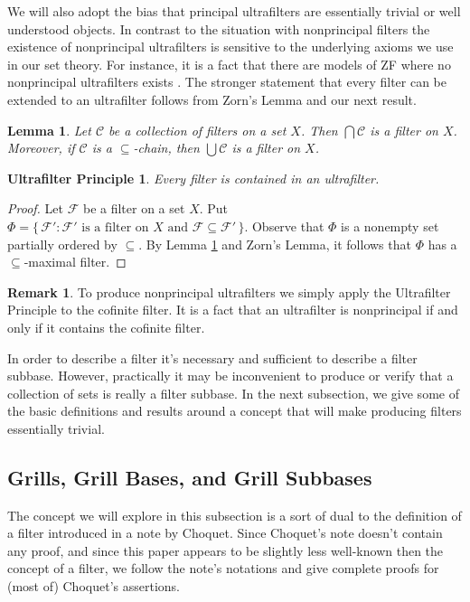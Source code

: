 \documentclass[12pt]{article}
\theoremstyle{plain}
\newtheorem{lem}[thm]{Lemma}
\newtheorem{up}[thm]{Ultrafilter Principle}
\theoremstyle{definition}
\newtheorem{rmk}[thm]{Remark}
\newcommand{\calC}{\mathcal{C}}
\newcommand{\calF}{\mathcal{F}}
\begin{document}
We will also adopt the bias that principal ultrafilters are
essentially trivial or well understood objects.
In contrast to the situation with nonprincipal filters the existence
of nonprincipal ultrafilters is sensitive to the underlying axioms we
use in our set theory.
For instance, it is a fact that there are models of ZF where no
nonprincipal ultrafilters exists \cite{Blass:1977fk}.
The stronger statement that every filter can be extended to an
ultrafilter follows from Zorn's Lemma and our next result.


\begin{lem}
  \label{lem:filterCh}
  Let $\calC$ be a collection of filters on a set $X$.
  Then $\bigcap\calC$ is a filter on $X$.
  Moreover, if $\calC$ is a \mbox{$\subseteq$-chain}, then
  $\bigcup\calC$ is a filter on $X$.
\end{lem}

\begin{up}
  Every filter is contained in an ultrafilter. 
\end{up}
\begin{proof}
  Let $\calF$ be a filter on a set $X$.
  Put $\Phi = \{\, \calF' : \mbox{$\calF'$ is a filter on $X$ and
    $\calF \subseteq \calF'$} \,\}$.
  Observe that $\Phi$ is a nonempty set partially ordered by
  $\subseteq$.
  By Lemma \ref{lem:filterCh} and Zorn's Lemma, it follows that $\Phi$
  has a \mbox{$\subseteq$-maximal} filter.
\end{proof}

\begin{rmk}
  To produce nonprincipal ultrafilters we simply apply the Ultrafilter
  Principle to the cofinite filter.  It is a fact that an ultrafilter
  is nonprincipal if and only if it contains the cofinite filter.
\end{rmk}

In order to describe a filter it's necessary and sufficient to
describe a filter subbase. 
However, practically it may be inconvenient to produce or verify that a
collection of sets is really a filter subbase.
In the next subsection, we give some of the basic definitions and
results around a concept that will make producing filters essentially
trivial.

\subsection{Grills, Grill Bases, and Grill Subbases}
The concept we will explore in this subsection is a sort of dual to
the definition of a filter introduced in a note \cite{Choquet:1947uq}
by Choquet.  
Since Choquet's note doesn't contain any proof, and since this paper
appears to be slightly less well-known then the concept of a filter,
we follow the note's notations and give complete proofs for (most of)
Choquet's assertions.
\end{document}
